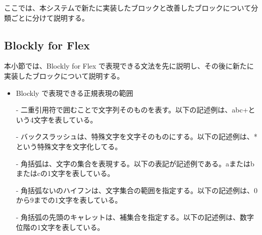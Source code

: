 \documentclass{risepaper}
\begin{document}
ここでは、本システムで新たに実装したブロックと改善したブロックについて分類ごとに分けて説明する。
   

   \subsection{Blockly for Flex}

本小節では、Blockly for Flex で表現できる文法を先に説明し、その後に新たに実装したブロックについて説明する。

\begin{itemize}

\item Blockly で表現できる正規表現の範囲

- 二重引用符で囲むことで文字列そのものを表す。以下の記述例は、abc+という4文字を表している。


- バックスラッシュは、特殊文字を文字そのものにする。以下の記述例は、* という特殊文字を文字化してる。

\shadowbox{
\begin{minipage}[t]{3cm}
\begin{verbatim}
\*
\end{verbatim}
\end{minipage}
}

- 角括弧は、文字の集合を表現する。以下の表記が記述例である。aまたはbまたはcの1文字を表している。

\shadowbox{
\begin{minipage}[t]{3cm}
\begin{verbatim}
[abc]
\end{verbatim}
\end{minipage}
}

- 角括弧ないのハイフンは、文字集合の範囲を指定する。以下の記述例は、0から9までの1文字を表している。

\shadowbox{
\begin{minipage}[t]{3cm}
\begin{verbatim}
[0-9]
\end{verbatim}
\end{minipage}
}

- 角括弧の先頭のキャレットは、補集合を指定する。以下の記述例は、数字位階の1文字を表している。


\end{itemize}
\end{document}
